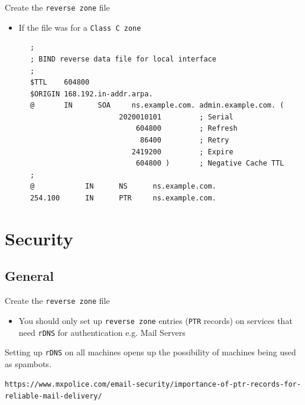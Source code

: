 \documentclass[xcolor=table,aspectratio=169]{beamer}
\begin{document}
\begin{frame}[fragile]{Create the \texttt{reverse zone} file}
  \begin{itemize}
    \item If the file was for a \texttt{Class C zone}
  \end{itemize}
  \begin{tcolorbox}
    \lstset{
      basicstyle=\tiny\ttfamily,
    }
    \begin{lstlisting}
      ;
      ; BIND reverse data file for local interface
      ;
      $TTL    604800
      $ORIGIN 168.192.in-addr.arpa.
      @       IN      SOA     ns.example.com. admin.example.com. (
                           2020010101         ; Serial
                               604800         ; Refresh
                                86400         ; Retry
                              2419200         ; Expire
                               604800 )       ; Negative Cache TTL
      ;
      @            IN      NS      ns.example.com.
      254.100      IN      PTR     ns.example.com.
          \end{lstlisting}
  \end{tcolorbox}
\end{frame}

\section{Security}
\subsection{General}
\begin{frame}{Create the \texttt{reverse zone} file}
  \begin{itemize}
    \item You should only set up \texttt{reverse zone} entries (\texttt{PTR} records) on services that need \texttt{rDNS} for authentication e.g. Mail Servers
  \end{itemize}
  \begin{tcolorbox}[title={\textbf{NOTE:}}]
       \scriptsize Setting up \texttt{rDNS} on all machines opens up the possibility of machines being used as spambots.
  \end{tcolorbox}
  \begin{tcolorbox}[title={\textbf{INFO:}}]
    \begin{center}
      \tiny{\texttt{https://www.mxpolice.com/email-security/importance-of-ptr-records-for-reliable-mail-delivery/}}      
    \end{center}
\end{tcolorbox}
\end{frame}
\end{document}
